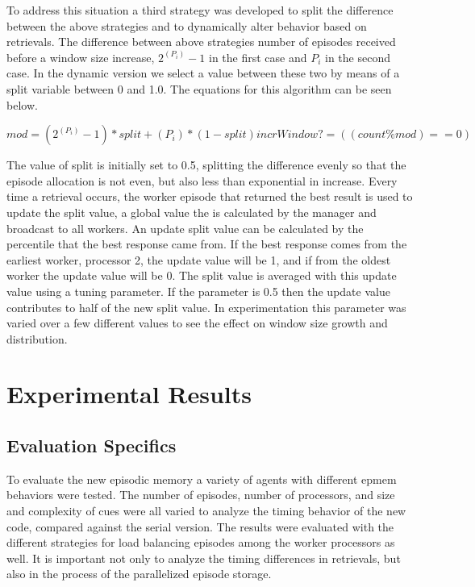 \documentclass[11pt]{article} %
\begin{document}
To address this situation a third strategy was developed to split the difference
between the above strategies and to dynamically alter behavior based on
retrievals. The difference between above strategies number of episodes received
before a window size increase, $2^(P_i) -1$ in the first case and $P_i$ in the
second case. In the dynamic version we select a value between these two by means
of a split variable between 0 and 1.0. The equations for this algorithm can be
seen below.

$mod = (2^(P_i) -1)*split + (P_i) *(1-split) incrWindow? = ((count \%  mod ) == 0)$

The value of split is initially set to 0.5, splitting the difference evenly so
that the episode allocation is not even, but also less than exponential in
increase. Every time a retrieval occurs, the worker episode that returned the
best result is used to update the split value, a global value the is calculated
by the manager and broadcast to all workers. An update split value can be
calculated by the percentile that the best response came from. If the best
response comes from the earliest worker, processor 2, the update value will be
1, and if from the oldest worker the update value will be 0. The split value is
averaged with this update value using a tuning parameter. If the parameter is
0.5 then the update value contributes to half of the new split value. In
experimentation this parameter was varied over a few different values to see the
effect on window size growth and distribution.

\section{Experimental Results}
\subsection{Evaluation Specifics}

To evaluate the new episodic memory a variety of agents with different epmem
behaviors were tested. The number of episodes, number of processors, and size
and complexity of cues were all varied to analyze the timing behavior of the new
code, compared against the serial version. The results were evaluated with the
different strategies for load balancing episodes among the worker processors as
well. It is important not only to analyze the timing differences in retrievals,
but also in the process of the parallelized episode storage.
\end{document}
